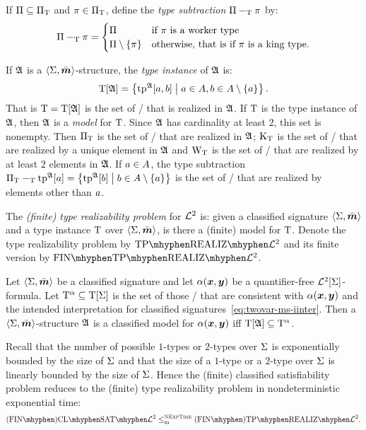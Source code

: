 If $\Pi \subseteq \Pi_{\mathrm{T}}$ and $\pi \in \Pi_{\mathrm{T}}$, define the
\emph{type subtraction} $\Pi -_{\mathrm{T}} \pi$ by:
\[
  \Pi -_{\mathrm{T}} \pi = \begin{cases}
    \Pi &\text{if } \pi \text{ is a worker type} \\
    \Pi \setminus \left\{\pi\right\} &\text{otherwise, that is if } \pi \text{ is a king
    type.}
  \end{cases}
\]

If $\mathfrak{A}$ is a $\left\langle \mathrm{\Sigma},\bar{\bm{m}} \right\rangle$-structure, the \emph{type instance} of $\mathfrak{A}$
is:
\[
  \mathrm{T}[\mathfrak{A}] = \left\{\operatorname{tp}^{\mathfrak{A}}[a,b]\mathrel{}\middle|\mathrel{}
    a \in A, b \in A \setminus\left\{a\right\}\right\}.
\]
That is $\mathrm{T} = \mathrm{T}[\mathfrak{A}]$ is the set of \twotypes/ that is realized in $\mathfrak{A}$.
If $\mathrm{T}$ is the type instance of $\mathfrak{A}$, then $\mathfrak{A}$ is a \emph{model} for
$\mathrm{T}$.
Since $\mathfrak{A}$ has cardinality at least $2$, this set is nonempty.
Then $\Pi_{\mathrm{T}}$ is the set of \onetypes/ that are realized in $\mathfrak{A}$;
$\mathrm{K}_{\mathrm{T}}$ is the set of \onetypes/ that are realized by a unique element in
$\mathfrak{A}$ and $\mathrm{W}_{\mathrm{T}}$ is the set of \onetypes/ that are realized by at least $2$
elements in $\mathfrak{A}$.
If $a \in A$, the type subtraction $\Pi_{\mathrm{T}} -_{\mathrm{T}} \operatorname{tp}^{\mathfrak{A}}[a] =
\left\{\operatorname{tp}^{\mathfrak{A}}[b]\mathrel{}\middle|\mathrel{}b \in A \setminus \left\{a\right\}\right\}$ is the set of \onetypes/ that
are realized by elements other than $a$.

\begin{definition}
The \emph{(finite) type realizability problem} for $\mathcal{L}^{2}$ is: given a
classified signature $\left\langle \mathrm{\Sigma},\bar{\bm{m}} \right\rangle$ and a type instance $\mathrm{T}$ over
$\left\langle \mathrm{\Sigma},\bar{\bm{m}} \right\rangle$, is there a (finite) model for $\mathrm{T}$.
Denote the type realizability problem by $\Real{\vFo2}$ and its finite version
by $\FinReal{\vFo2}$.
\end{definition}

\begin{remark}\label{rem:red-sat-to-real}
Let $\left\langle \mathrm{\Sigma},\bar{\bm{m}} \right\rangle$ be a classified signature and let $\alpha(\bm{x},\bm{y})$ be a
quantifier-free $\mathcal{L}^{2}[\mathrm{\Sigma}]$-formula.
Let $\mathrm{T}^\alpha \subseteq \mathrm{T}[\mathrm{\Sigma}]$ is the set of those \twotypes/ that are
consistent with $\alpha(\bm{x},\bm{y})$ and the intended interpretation
for classified signatures~\cref{eq:twovar-ms-iinter}.
Then a $\left\langle \mathrm{\Sigma},\bar{\bm{m}} \right\rangle$-structure $\mathfrak{A}$ is a classified model for
$\alpha(\bm{x},\bm{y})$ iff $\mathrm{T}[\mathfrak{A}] \subseteq \mathrm{T}^\alpha$.

Recall that the number of possible $1$-types or $2$-types over $\mathrm{\Sigma}$ is
exponentially bounded by the size of $\mathrm{\Sigma}$ and that the size of a $1$-type or
a $2$-type over $\mathrm{\Sigma}$ is linearly bounded by the size of $\mathrm{\Sigma}$.
Hence the (finite) classified satisfiability problem reduces to the
(finite) type realizability problem in nondeterministic exponential time:
\[
  \FinAClSat{\vFo2} \red\cNExpTime \FinAReal{\vFo2}.
\]
\end{remark}

